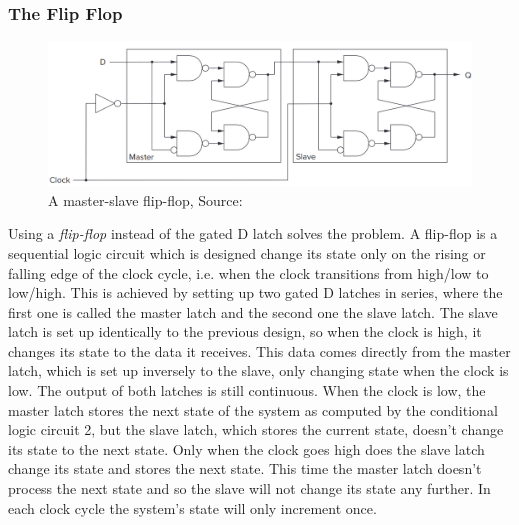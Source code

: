 \subsubsection{The Flip Flop}
\begin{figure}[bp!]
    \begin{center}\includegraphics[scale=0.5]{Figures/MasterSlaveFlipFlop.png}\end{center}
    \caption[Master-Slave flip-flop]{A master-slave flip-flop, Source: \cite[Chapter 3.6.6]{danger_sign}}
    \label{fig::MasterSlaveFlipFlop}
\end{figure}
Using a \emph{flip-flop} instead of the gated D latch solves the problem. A flip-flop is a sequential logic circuit which is designed change its state only on the rising or falling edge of the clock cycle, i.e. when the clock transitions from high/low to low/high. This is achieved by setting up two gated D latches in series, where the first one is called the master latch and the second one the slave latch. The slave latch is set up identically to the previous design, so when the clock is high, it changes its state to the data it receives. This data comes directly from the master latch, which is set up inversely to the slave, only changing state when the clock is low. The output of both latches is still continuous. When the clock is low, the master latch stores the next state of the system as computed by the conditional logic circuit 2, but the slave latch, which stores the current state, doesn't change its state to the next state. Only when the clock goes high does the slave latch change its state and stores the next state. This time the master latch doesn't process the next state and so the slave will not change its state any further. In each clock cycle the system's state will only increment once.

